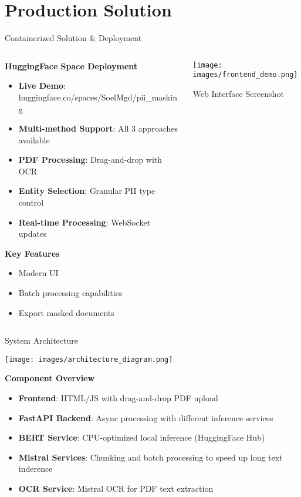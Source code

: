 \documentclass[aspectratio=169]{beamer}
\begin{document}
\section{Production Solution}

\begin{frame}{Containerized Solution \& Deployment}
\begin{columns}
\begin{column}{0.5\textwidth}
\textbf{HuggingFace Space Deployment}
\begin{itemize}
\item \textbf{Live Demo}: huggingface.co/spaces/SoelMgd/pii\_masking
\item \textbf{Multi-method Support}: All 3 approaches available
\item \textbf{PDF Processing}: Drag-and-drop with OCR
\item \textbf{Entity Selection}: Granular PII type control
\item \textbf{Real-time Processing}: WebSocket updates
\end{itemize}

\vspace{0.3cm}
\textbf{Key Features}
\begin{itemize}
\item Modern UI
\item Batch processing capabilities
\item Export masked documents
\end{itemize}
\end{column}
\begin{column}{0.5\textwidth}
\begin{center}
\texttt{[image: images/frontend\_demo.png]}
\caption{Web Interface Screenshot}
\end{center}
\end{column}
\end{columns}
\end{frame}

\begin{frame}{System Architecture}
\begin{center}
\texttt{[image: images/architecture\_diagram.png]}
\end{center}

\vspace{0.3cm}
\textbf{Component Overview}
\begin{itemize}
\item \textbf{Frontend}: HTML/JS with drag-and-drop PDF upload
\item \textbf{FastAPI Backend}: Async processing with different inference services
\item \textbf{BERT Service}: CPU-optimized local inference (HuggingFace Hub)
\item \textbf{Mistral Services}: Chunking and batch processing to speed up long text inderence
\item \textbf{OCR Service}: Mistral OCR for PDF text extraction
\end{itemize}
\end{frame}
\end{document}
